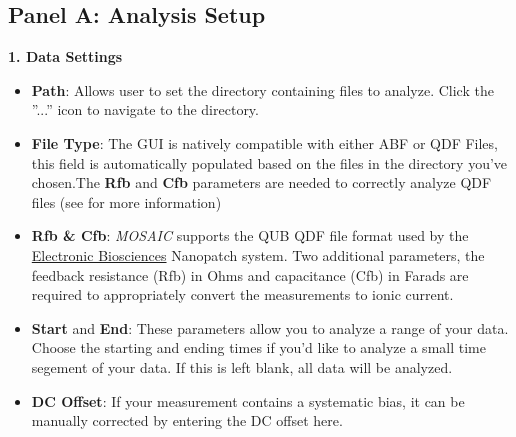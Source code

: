 \documentclass[letterpaper,10pt,english]{sphinxmanual}
\begin{document}
\subsection{Panel A: Analysis Setup}
\label{doc/GraphicalInterface:analysis-setup}\label{doc/GraphicalInterface:panel-a-analysis-setup}
\textbf{1. Data Settings}
\begin{itemize}
\item {} 
\textbf{Path}: Allows user to set the directory containing files to analyze. Click the ''...'' icon to navigate to the directory.

\item {} 
\textbf{File Type}: The GUI is natively compatible with either ABF or QDF Files, this field is automatically populated based on the files in the directory you've chosen.The \textbf{Rfb} and \textbf{Cfb} parameters are needed to correctly analyze QDF files (see {\hyperref[api\string-doc/mosaic.traj:module\string-mosaic.qdfTrajIO]{\emph{}}} for more information)

\item {} 
\textbf{Rfb \& Cfb}: \emph{MOSAIC} supports the QUB QDF file format used by the \href{http://electronicbio.com}{Electronic Biosciences} Nanopatch system. Two additional parameters, the feedback resistance (Rfb) in Ohms and capacitance (Cfb) in Farads are required to appropriately convert the measurements to ionic current.

\item {} 
\textbf{Start} and \textbf{End}: These parameters allow you to analyze a range of your data. Choose the starting and ending times if you'd like to analyze a small time segement of your data. If this is left blank, all data will be analyzed.

\item {} 
\textbf{DC Offset}: If your measurement contains a systematic bias, it can be manually corrected by entering the DC offset here.

\end{itemize}
\end{document}
